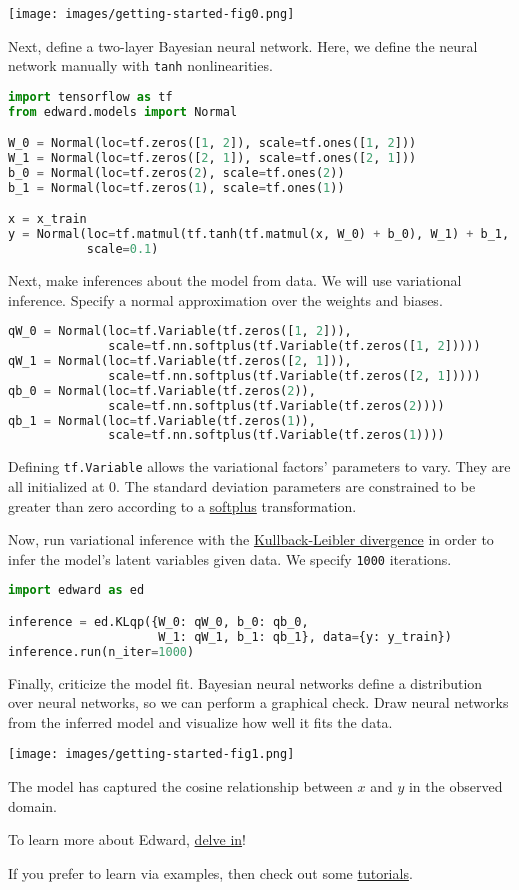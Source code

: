 \texttt{[image: images/getting-started-fig0.png]}

Next, define a two-layer Bayesian neural network. Here, we
define the neural network manually with \texttt{tanh} nonlinearities.

\begin{lstlisting}[language=Python]
import tensorflow as tf
from edward.models import Normal

W_0 = Normal(loc=tf.zeros([1, 2]), scale=tf.ones([1, 2]))
W_1 = Normal(loc=tf.zeros([2, 1]), scale=tf.ones([2, 1]))
b_0 = Normal(loc=tf.zeros(2), scale=tf.ones(2))
b_1 = Normal(loc=tf.zeros(1), scale=tf.ones(1))

x = x_train
y = Normal(loc=tf.matmul(tf.tanh(tf.matmul(x, W_0) + b_0), W_1) + b_1,
           scale=0.1)
\end{lstlisting}

Next, make inferences about the model from data. We will use variational
inference. Specify a normal approximation over the weights and biases.

\begin{lstlisting}[language=Python]
qW_0 = Normal(loc=tf.Variable(tf.zeros([1, 2])),
              scale=tf.nn.softplus(tf.Variable(tf.zeros([1, 2]))))
qW_1 = Normal(loc=tf.Variable(tf.zeros([2, 1])),
              scale=tf.nn.softplus(tf.Variable(tf.zeros([2, 1]))))
qb_0 = Normal(loc=tf.Variable(tf.zeros(2)),
              scale=tf.nn.softplus(tf.Variable(tf.zeros(2))))
qb_1 = Normal(loc=tf.Variable(tf.zeros(1)),
              scale=tf.nn.softplus(tf.Variable(tf.zeros(1))))
\end{lstlisting}

Defining \texttt{tf.Variable} allows the variational factors'
parameters to vary. They are all initialized at 0. The standard
deviation parameters are constrained to be greater than zero according
to a
\href{https://en.wikipedia.org/wiki/Rectifier_(neural_networks)}{softplus}
transformation.

Now, run variational inference with the
\href{https://en.wikipedia.org/wiki/Kullback–Leibler_divergence}{Kullback-Leibler divergence}
in order to infer the model's latent variables given data.
We specify \texttt{1000} iterations.

\begin{lstlisting}[language=Python]
import edward as ed

inference = ed.KLqp({W_0: qW_0, b_0: qb_0,
                     W_1: qW_1, b_1: qb_1}, data={y: y_train})
inference.run(n_iter=1000)
\end{lstlisting}

Finally, criticize the model fit. Bayesian neural networks define a distribution
over neural networks, so we can perform a graphical check. Draw neural networks
from the inferred model and visualize how well it fits the data.

\texttt{[image: images/getting-started-fig1.png]}

The model has captured the cosine relationship between $x$ and $y$
in the observed domain.

To learn more about Edward, \href{/api}{delve in}!

If you prefer to learn via examples, then check out some
\href{/tutorials/}{tutorials}.
